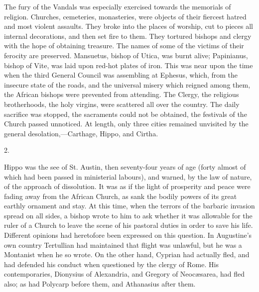 The fury of the Vandals was especially exercised towards the
memorials of religion. Churches, cemeteries, monasteries, were objects
of their fiercest hatred and most violent assaults. They broke into
the places of worship, cut to pieces all internal decorations, and
then set fire to them. They tortured bishops and clergy with the
hope of obtaining treasure. The names of some of the victims of their
ferocity are preserved. Mansuetus, bishop of Utica, was burnt alive;
Papinianus, bishop of Vite, was laid upon red-hot plates of iron. This
was near upon the time when the third General Council was assembling
at Ephesus, which, from the insecure state of the roads, and the
universal misery which reigned among them, the African bishops were
prevented from attending. The Clergy, the religious brotherhoods, the
holy virgins, were scattered all over the country. The daily sacrifice
was stopped, the sacraments could not be obtained, the festivals of
the Church passed unnoticed. At length, only three cities remained
unvisited by the general desolation,—Carthage, Hippo, and Cirtha.

2.

Hippo was the see of St. Austin, then seventy-four years of age
(forty almost of which had been passed in ministerial labours), and
warned, by the law of nature, of the approach of dissolution. It was
as if the light of prosperity and peace were fading away from the
African Church, as sank the bodily powers of its great earthly
ornament and stay. At this time, when the terrors of the barbaric
invasion spread on all sides, a bishop wrote to him to ask whether it
was allowable for the ruler of a Church to leave the scene of his
pastoral duties in order to save his life. Different opinions had
heretofore been expressed on this question. In Augustine's own country
Tertullian had maintained that flight was unlawful, but he was a
Montanist when he so wrote. On the other hand, Cyprian had actually
fled, and had defended his conduct when questioned by the clergy of
Rome. His contemporaries, Dionysius of Alexandria, and Gregory
of Neocæsarea, had fled also; as had Polycarp before them, and
Athanasius after them.

